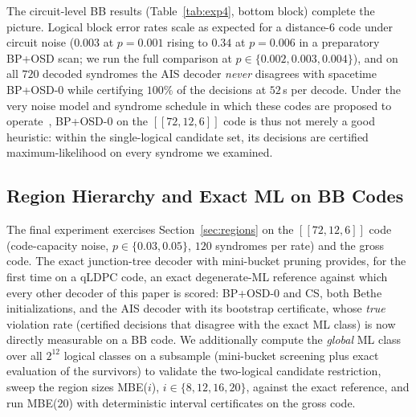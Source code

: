 \documentclass[a4paper,11pt]{quantumarticle}
\theoremstyle{definition}
\begin{document}
The circuit-level BB results (Table~\ref{tab:exp4}, bottom block) complete
the picture. Logical block error rates scale as expected for a distance-6
code under circuit noise ($0.003$ at $p=0.001$ rising to $0.34$ at
$p=0.006$ in a preparatory BP+OSD scan; we run the full comparison at
$p\in\{0.002,0.003,0.004\}$), and on all $720$ decoded syndromes the AIS
decoder \emph{never} disagrees with spacetime BP+OSD-0 while certifying
$100\%$ of the decisions at $52$\,s per decode. Under the very noise model
and syndrome schedule in which these codes are proposed to
operate~\cite{bravyi2024}, BP+OSD-0 on the $[\![72,12,6]\!]$ code is thus
not merely a good heuristic: within the single-logical candidate set, its
decisions are certified maximum-likelihood on every syndrome we
examined.

\subsection{Region Hierarchy and Exact ML on BB Codes}
\label{sec:exp5}
The final experiment exercises Section~\ref{sec:regions} on the
$[\![72,12,6]\!]$ code (code-capacity noise, $p\in\{0.03,0.05\}$, $120$
syndromes per rate) and the gross code. The exact junction-tree decoder
with mini-bucket pruning provides, for the first time on a qLDPC code, an
exact degenerate-ML reference against which every other decoder of this
paper is scored: BP+OSD-0 and CS, both Bethe initializations, and the AIS
decoder with its bootstrap certificate, whose \emph{true} violation rate
(certified decisions that disagree with the exact ML class) is now
directly measurable on a BB code. We additionally compute the
\emph{global} ML class over all $2^{12}$ logical classes on a subsample
(mini-bucket screening plus exact evaluation of the survivors) to validate
the two-logical candidate restriction, sweep the region sizes
MBE($i$), $i\in\{8,12,16,20\}$, against the exact reference, and run
MBE($20$) with deterministic interval certificates on the gross code.
\end{document}
